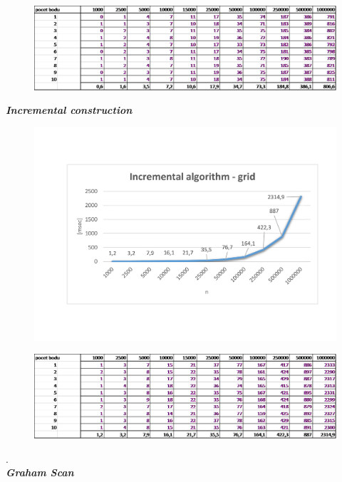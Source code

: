 \documentclass{article}
\begin{document}
\begin{figure}[htbp]
\centering
        \includegraphics[clip, trim=0cm 0cm 0cm 0cm, width=1\textwidth]{qg.png}
\end{figure}
\clearpage
\newpage
\textit{\textbf {Incremental construction}}
\\
\begin{figure}[htbp]
\centering
        \includegraphics[clip, trim=0cm 0cm 0cm 0cm, width=1\textwidth]{ig.pdf}
\end{figure}
\begin{figure}[htbp]
\centering
        \includegraphics[clip, trim=0cm 0cm 0cm 0cm, width=1\textwidth]{ig.png}
\end{figure}
.\\
\bigskip
\clearpage
\newpage
\textit{\textbf {Graham Scan}}
\\
\end{document}
